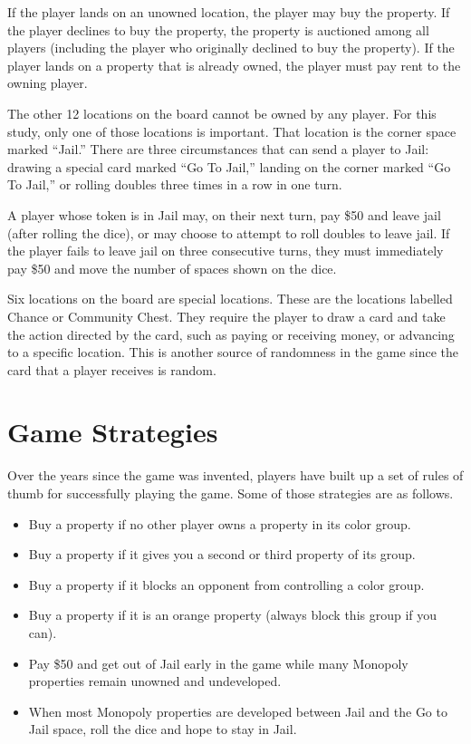 If the player lands on an unowned location, the player may buy the property. If
the player declines to buy the property, the property is auctioned among all
players (including the player who originally declined to buy the property).
If the player lands on a property that is already owned, the player must pay
rent to the owning player.

The other 12 locations on the board cannot be owned by any player. For this
study, only one of those locations is important. That location is the corner
space marked ``Jail.'' There are three circumstances that can send a player to
Jail: drawing a special card marked ``Go To Jail,'' landing on the corner marked
``Go To Jail,'' or rolling doubles three times in a row in one turn.

A player whose token is in Jail may, on their next turn, pay \$50 and leave jail
(after rolling the dice), or may choose to attempt to roll doubles to leave
jail. If the player fails to leave jail on three consecutive turns, they must
immediately pay \$50 and move the number of spaces shown on the dice.

Six locations on the board are special locations. These are the locations
labelled Chance or Community Chest. They require the player to draw a card and
take the action directed by the card, such as paying or receiving money, or
advancing to a specific location. This is another source of randomness in the
game since the card that a player receives is random.

\section{Game Strategies} \label{m_gamestrategies}
Over the years since the game was invented, players have built up a set of rules
of thumb for successfully playing the game. Some of those strategies are as
follows.

\begin{itemize}
  \item {Buy a property if no other player owns a property in its color group.}
  \item {Buy a property if it gives you a second or third property of its
  group.}
  \item {Buy a property if it blocks an opponent from controlling a color
  group.}
  \item {Buy a property if it is an orange property (always block this group if
  you can).}
  \item {Pay \$50 and get out of Jail early in the game while many Monopoly
  properties remain unowned and undeveloped.}
  \item {When most Monopoly properties are developed between Jail and the Go to
  Jail space, roll the dice and hope to stay in Jail.}
\end{itemize}